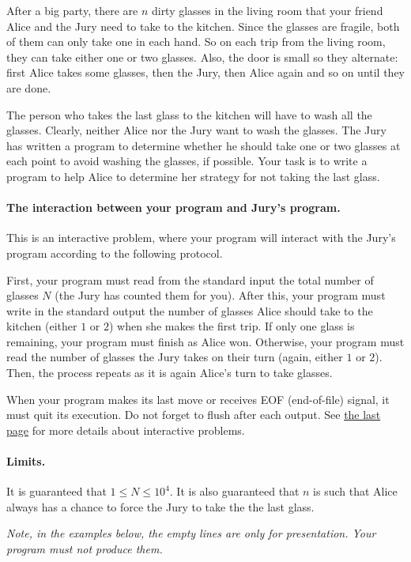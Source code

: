 After a big party, there are $n$ dirty glasses in the living room that your friend Alice and the Jury need to take to the kitchen.
Since the glasses are fragile, both of them can only take one in each hand.
So on each trip from the living room, they can take either one or two glasses.
Also, the door is small so they alternate: first Alice takes some glasses, then the Jury, then Alice again and so on until they are done.

The person who takes the last glass to the kitchen will have to wash all the glasses.
Clearly, neither Alice nor the Jury want to wash the glasses.
The Jury has written a program to determine whether he should take one or two glasses at each point to avoid washing the glasses, if possible.
Your task is to write a program to help Alice to determine her strategy for not taking the last glass.

\paragraph{The interaction between your program and Jury's program.}
This is an interactive problem, where your program will interact with the Jury's program according to the following protocol.

First, your program must read from the standard input the total number of glasses $N$ (the Jury has counted them for you).
After this, your program must write in the standard output the number of glasses Alice should take to the kitchen (either $1$ or $2$) when she makes the first trip.
If only one glass is remaining, your program must finish as Alice won.
Otherwise, your program must read the number of glasses the Jury takes on their turn (again, either $1$ or $2$).
Then, the process repeats as it is again Alice's turn to take glasses.

When your program makes its last move or receives EOF (end-of-file) signal, it must quit its execution.
Do not forget to flush after each output.
See \hyperlink{info-interactive}{the last page} for more details about interactive problems.

\paragraph{Limits.}
It is guaranteed that $1 \leq N \leq 10^4$.
It is also guaranteed that $n$ is such that Alice always has a chance to force the Jury to take the the last glass.

\emph{Note, in the examples below, the empty lines are only for presentation.
Your program must not produce them.}
{
\renewcommand{\sampleinputname}{Jury's output}
\renewcommand{\sampleoutputname}{Your output}
}